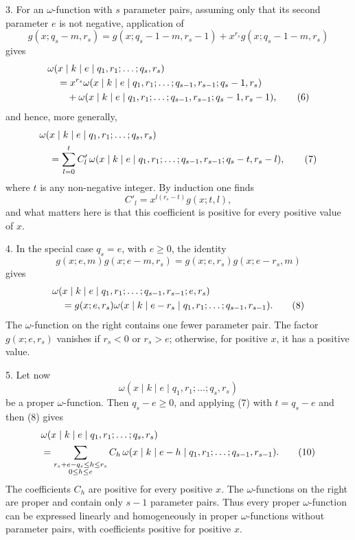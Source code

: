 \documentclass[11pt,a4paper]{article}
\begin{document}
3. For an $\omega$-function with $s$ parameter pairs, assuming only that its second parameter $e$ is not negative, application of
\[
 g(x;q_s-m,r_s)=g(x;q_s-1-m,r_s-1)+x^{r_s}g(x;q_s-1-m,r_s)
\]
gives
\begin{align}
&\omega(x\mid k\mid e\mid q_1,r_1;\ldots;q_s,r_s)\notag\\
&\quad=x^{r_s}\omega(x\mid k\mid e\mid q_1,r_1;\ldots;q_{s-1},r_{s-1};q_s-1,r_s)\notag\\
&\qquad+\omega(x\mid k\mid e\mid q_1,r_1;\ldots;q_{s-1},r_{s-1};q_s-1,r_s-1),
\tag{6}
\end{align}
and hence, more generally,
\begin{align}
&\omega(x\mid k\mid e\mid q_1,r_1;\ldots;q_s,r_s)\notag\\
&\quad=\sum_{l=0}^t C'_l\,
 \omega(x\mid k\mid e\mid q_1,r_1;\ldots;q_{s-1},r_{s-1};q_s-t,r_s-l),
\tag{7}
\end{align}
where $t$ is any non-negative integer. By induction one finds
\[
 C'_l=x^{l(r_s-t)}g(x;t,l),
\]
and what matters here is that this coefficient is positive for every positive value of $x$.

4. In the special case $q_s=e$, with $e\ge0$, the identity
\[
 g(x;e,m)g(x;e-m,r_s)=g(x;e,r_s)g(x;e-r_s,m)
\]
gives
\begin{align}
&\omega(x\mid k\mid e\mid q_1,r_1;\ldots;q_{s-1},r_{s-1};e,r_s)\notag\\
&\quad=g(x;e,r_s)\omega(x\mid k\mid e-r_s\mid q_1,r_1;\ldots;q_{s-1},r_{s-1}).
\tag{8}
\end{align}
The $\omega$-function on the right contains one fewer parameter pair. The factor $g(x;e,r_s)$ vanishes if $r_s<0$ or $r_s>e$; otherwise, for positive $x$, it has a positive value.

5. Let now
\[
 \omega(x\mid k\mid e\mid q_1,r_1;\ldots;q_s,r_s)
\]
be a proper $\omega$-function. Then $q_s-e\ge0$, and applying (7) with $t=q_s-e$ and then (8) gives
\begin{align}
&\omega(x\mid k\mid e\mid q_1,r_1;\ldots;q_s,r_s)\notag\\
&=\sum_{\substack{r_s+e-q_s\le h\le r_s\\0\le h\le e}}
 C_h\,\omega(x\mid k\mid e-h\mid q_1,r_1;\ldots;q_{s-1},r_{s-1}).
\tag{10}
\end{align}
The coefficients $C_h$ are positive for every positive $x$. The $\omega$-functions on the right are proper and contain only $s-1$ parameter pairs. Thus every proper $\omega$-function can be expressed linearly and homogeneously in proper $\omega$-functions without parameter pairs, with coefficients positive for positive $x$.
\end{document}

